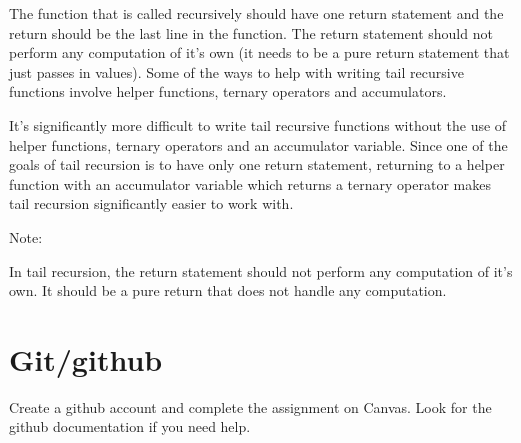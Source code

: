 \documentclass[11pt,a4paper,english]{paper}
\begin{document}
The function that is called recursively should have one return statement and the return should be the last line in the function. The return statement should not perform any computation of it's own (it needs to be a pure return statement that just passes in values). Some of the ways to help with writing tail recursive functions involve helper functions, ternary operators and accumulators. 

\bigskip
\begin{bbox}{Figure 3:} {
\end{bbox}

\bigskip
\noindent It's significantly more difficult to write tail recursive functions without the use of helper functions, ternary operators and an accumulator variable. Since one of the goals of tail recursion is to have only one return statement, returning to a helper function with an accumulator variable which returns a ternary operator makes tail recursion significantly easier to work with.

\begin{mybox}{Note:} {

  In tail recursion, the return statement should not perform any computation of it's own. It should be a pure return that does not handle any computation.

}\end{mybox}


\section{Git/github}

Create a github account and complete the assignment on Canvas. Look for the github documentation if you need help.
\end{document}
